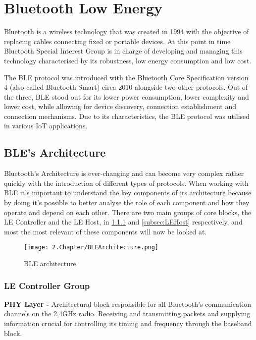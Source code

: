 \section{Bluetooth Low Energy}
\label{sec:ble}

Bluetooth is a wireless technology that was created in 1994 with the objective of replacing cables connecting fixed or portable devices. At this point in time Bluetooth Special Interest Group is in charge of developing and managing this technology characterised by its robustness, low energy consumption and low cost. 

The \ac{BLE} protocol was introduced with the Bluetooth Core Specification version 4 (also called Bluetooth Smart) circa 2010 alongside two other protocols.  Out of the three, \ac{BLE} stood out for its lower power consumption, lower complexity and lower cost, while allowing for  device discovery, connection establishment and connection mechanisms. Due to its characteristics, the \ac{BLE} protocol was utilised in various \ac{IoT} applications.  

\subsection{\ac{BLE}'s Architecture}
\label{subsec:BLEArchitecture}

Bluetooth's Architecture is ever-changing and can become very complex rather quickly with the introduction of different types of protocols.
 When working with \ac{BLE} it's important to understand the key components of its architecture  because by doing it's possible to better analyse the role of each component and how they operate and depend on each other. There are two main groups of core blocks, the \ac{LE} Controller and the \ac{LE} Host, in \ref{subsec:LEController} and \ref{subsec:LEHost} respectively, and most the most relevant of these components will now be looked at.
 
 \begin{figure}[H]
	\centering
		\texttt{[image: 2.Chapter/BLEArchitecture.png]}
	\caption[\ac{BLE} Architecture]{\ac{BLE} architecture}
	\label{fig:BLEarchitecture}
\end{figure}

\subsubsection{ \ac{LE} Controller Group}
\label{subsec:LEController}

\textbf{\ac{PHY} Layer -} Architectural block responsible for all Bluetooth’s communication channels on the 2,4GHz radio. Receiving and transmitting packets and supplying information crucial for controlling its timing and frequency through the baseband block.


